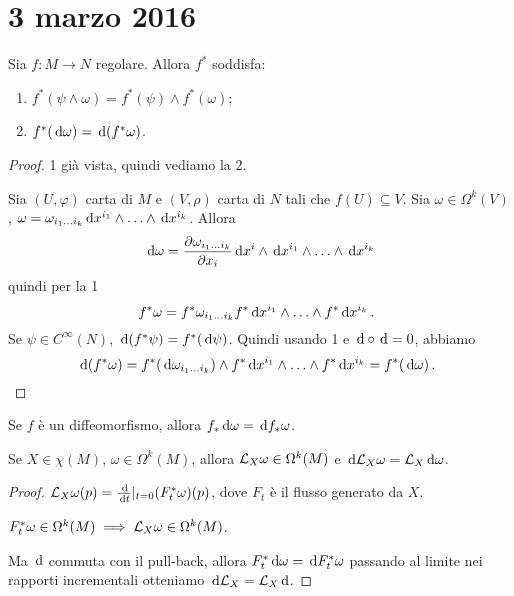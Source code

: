 \chapter{3 marzo 2016}

\begin{theorem}
	Sia $f:M\to N$ regolare. Allora $f^*$ soddisfa:
	\begin{enumerate}
		\item $f^*(\psi \wedge \omega) = f^*(\psi) \wedge f^*(\omega)$;
		\item $f^*(\,\mathrm d \omega) = \,\mathrm d (f^*\omega)$.
	\end{enumerate}
\end{theorem}
\begin{proof}
	1 già vista, quindi vediamo la 2.
	
	Sia $(U,\varphi)$ carta di $M$ e $(V,\rho)$ carta di $N$ tali che $f(U)\subseteq V$. Sia $\omega\in\Omega^k(V)$, $\omega = \omega_{i_1 \ldots  i_{k}} \,\mathrm d x^{i_1}\wedge\ldots\wedge \,\mathrm d x^{i_k}$. Allora
	\begin{equation*}
		\,\mathrm d \omega = \frac{\partial \omega_{i_1 \ldots  i_{k}}}{\partial x_i} \,\mathrm d x^i \wedge \,\mathrm d x^{i_1} \wedge \ldots \wedge \,\mathrm d x^{i_k}
	\end{equation*}
	quindi per la 1
	\begin{equation*}
		f^*\omega = f^*\omega_{i_1 \ldots  i_{k}} f^*\,\mathrm d x^{i_1} \wedge \ldots \wedge f^* \,\mathrm d x^{i_k}\, \text{. }
	\end{equation*}
	Se $\psi \in C^\infty(N)$, $\,\mathrm d (f^*\psi) = f^* (\,\mathrm d \psi)$. Quindi usando 1 e $\,\mathrm d\circ\,\mathrm d =0$, abbiamo
	\begin{equation*}
		\,\mathrm d (f^*\omega) = f^*(\,\mathrm d \omega_{i_1 \ldots  i_{k}})\wedge f^*\,\mathrm d x^{i_1} \wedge \ldots \wedge f^*\,\mathrm d x^{i_k} = f^*(\,\mathrm d\omega)\, \text{. }
	\end{equation*}
\end{proof}

\begin{corollary}
	Se $f$ è un diffeomorfismo, allora $f_*\,\mathrm d\omega = \,\mathrm d f_* \omega$.
\end{corollary}

\begin{corollary}
	Se $X\in\chi(M)$, $\omega \in \Omega^k(M)$, allora $\mathcal L_X\omega \in \Omega^k(M)$ e $\,\mathrm d \mathcal L_X\omega = \mathcal L_X \,\mathrm d \omega$.
\end{corollary}

\begin{proof}
$\mathcal L_X\omega(p) = \frac{\,\mathrm d}{\,\mathrm d t} |_{t=0} (F_t^*\omega)(p)$, dove $F_t$ è il flusso generato da $X$.

$F_t^*\omega\in \Omega^k(M) \implies \mathcal L_X\omega \in \Omega^k(M)$.

Ma $\,\mathrm d$ commuta con il pull-back, allora $F_t^* \,\mathrm d\omega = \,\mathrm d F_t^* \omega$ passando al limite nei rapporti incrementali otteniamo $\,\mathrm d \mathcal L_X = \mathcal L_X \,\mathrm d$.
\end{proof}


